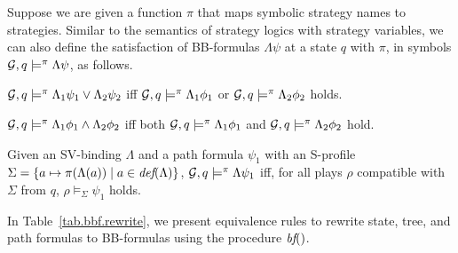 Suppose we are given a function $\pi$ that maps symbolic strategy 
names to strategies.  
Similar to the semantics of 
strategy logics \cite{MMV10} with strategy variables, 
we can also define the satisfaction of BB-formulas 
$\Lambda\psi$ at a state $q$ with $\pi$, 
in symbols ${\cal G},q\models^\pi\Lambda\psi$,  
as follows. 
\begin{list1} 
\item ${\cal G},q\models^\pi \Lambda_1\psi_1\vee\Lambda_2\psi_2$ iff 
	${\cal G},q\models^\pi \Lambda_1\phi_1$ or 
	${\cal G},q\models^\pi \Lambda_2\phi_2$ holds. 
\item ${\cal G},q\models^\pi \Lambda_1\phi_1\wedge\Lambda_2\phi_2$ iff both 
	${\cal G},q\models^\pi \Lambda_1\phi_1$ and  
	${\cal G},q\models^\pi \Lambda_2\phi_2$ hold. 
\item Given an SV-binding $\Lambda$ and a path formula $\psi_1$ with  
	an S-profile 
	$\Sigma=\{a\mapsto \pi(\Lambda(a))\mid a\in\textit{def}(\Lambda)\}$, 
	${\cal G},q\models^\pi \Lambda\psi_1$ iff, for all plays $\rho$ 
	compatible with $\Sigma$ from $q$, 
	$\rho\models_\Sigma \psi_1$ holds. 
\end{list1} 
In Table~\ref{tab.bbf.rewrite}, 
we present equivalence rules to rewrite state, tree, and path 
formulas to BB-formulas 
using the procedure $\textit{bf}()$.  
